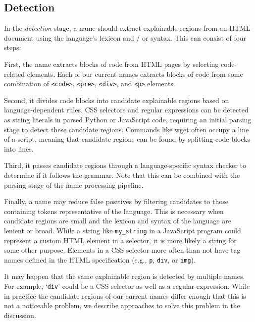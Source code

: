 \subsection{Detection}
In the \emph{detection} stage, a \Gls{name} should extract explainable regions from an HTML document using the language's lexicon and / or syntax.
This can consist of four steps:

First, the \Gls{name} extracts blocks of code from HTML pages by selecting code-related elements.
Each of our current \Glspl{name} extracts blocks of code from some combination of \texttt{<code>}, \texttt{<pre>}, \texttt{<div>}, and \texttt{<p>} elements.

Second, it divides code blocks into candidate explainable regions based on language-dependent rules.
CSS selectors and regular expressions can be detected as string literals in parsed Python or JavaScript code, requiring an initial parsing stage to detect these candidate regions.
Commands like wget often occupy a line of a script, meaning that candidate regions can be found by splitting code blocks into lines.

Third, it passes candidate regions through a language-specific syntax checker to determine if it follows the grammar.
Note that this can be combined with the parsing stage of the \Gls{name} processing pipeline.

Finally, a \Gls{name} may reduce false positives by filtering candidates to those containing tokens representative of the language.
This is necessary when candidate regions are small and the lexicon and syntax of the language are lenient or broad.
While a string like \texttt{\qs{}my\_string\qs{}} in a JavaScript program could represent a custom HTML element in a selector, it is more likely a string for some other purpose.
Elements in a CSS selector more often than not have tag names defined in the HTML specification (e.g., \texttt{p}, \texttt{div}, or \texttt{img}).

\begin{changes}
It may happen that the same explainable region is detected by multiple \Glspl{name}.
For example, `\texttt{div}' could be a CSS selector as well as a regular expression.
While in practice the candidate regions of our current \Glspl{name} differ enough that this is not a noticeable problem, we describe approaches to solve this problem in the discussion.
\end{changes}

